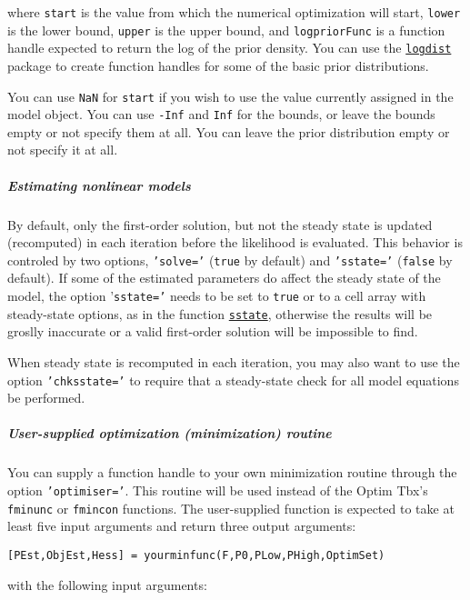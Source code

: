where \texttt{start} is the value from which the numerical optimization
will start, \texttt{lower} is the lower bound, \texttt{upper} is the
upper bound, and \texttt{logpriorFunc} is a function handle expected to
return the log of the prior density. You can use the
\href{logdist/Contents}{\texttt{logdist}} package to create function
handles for some of the basic prior distributions.

You can use \texttt{NaN} for \texttt{start} if you wish to use the value
currently assigned in the model object. You can use \texttt{-Inf} and
\texttt{Inf} for the bounds, or leave the bounds empty or not specify
them at all. You can leave the prior distribution empty or not specify
it at all.

\subparagraph{Estimating nonlinear
models}

By default, only the first-order solution, but not the steady state is
updated (recomputed) in each iteration before the likelihood is
evaluated. This behavior is controled by two options, \texttt{'solve='}
(\texttt{true} by default) and \texttt{'sstate='} (\texttt{false} by
default). If some of the estimated parameters do affect the steady state
of the model, the option '\texttt{sstate='} needs to be set to
\texttt{true} or to a cell array with steady-state options, as in the
function \href{model/sstate}{\texttt{sstate}}, otherwise the results
will be groslly inaccurate or a valid first-order solution will be
impossible to find.

When steady state is recomputed in each iteration, you may also want to
use the option \texttt{'chksstate='} to require that a steady-state
check for all model equations be performed.

\subparagraph{User-supplied optimization (minimization)
routine}

You can supply a function handle to your own minimization routine
through the option \texttt{'optimiser='}. This routine will be used
instead of the Optim Tbx's \texttt{fminunc} or \texttt{fmincon}
functions. The user-supplied function is expected to take at least five
input arguments and return three output arguments:

\begin{verbatim}
[PEst,ObjEst,Hess] = yourminfunc(F,P0,PLow,PHigh,OptimSet)
\end{verbatim}

with the following input arguments:

